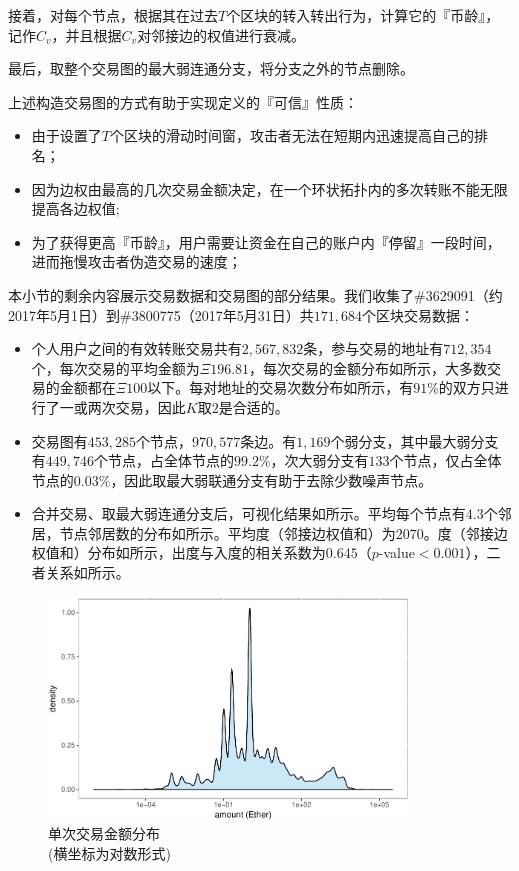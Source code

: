 接着，对每个节点，根据其在过去$T$个区块的转入转出行为，计算它的『币龄』，记作$C_v$，并且根据$C_v$对邻接边的权值进行衰减。

最后，取整个交易图的最大弱连通分支，将分支之外的节点删除。

上述构造交易图的方式有助于实现定义的『可信』性质：
\begin{itemize}
	\item 由于设置了$T$个区块的滑动时间窗，攻击者无法在短期内迅速提高自己的排名；
	\item 因为边权由最高的几次交易金额决定，在一个环状拓扑内的多次转账不能无限提高各边权值;
	\item 为了获得更高『币龄』，用户需要让资金在自己的账户内『停留』一段时间，进而拖慢攻击者伪造交易的速度；
\end{itemize}

本小节的剩余内容展示交易数据和交易图的部分结果。我们收集了\#3629091（约2017年5月1日）到\#3800775（2017年5月31日）共$171,684$个区块交易数据：
\begin{itemize}
	\item 个人用户之间的有效转账交易共有$2,567,832$条，参与交易的地址有$712,354$个，每次交易的平均金额为$\Xi 196.81$，每次交易的金额分布如所示，大多数交易的金额都在$\Xi 100$以下。每对地址的交易次数分布如所示，有$91\%$的双方只进行了一或两次交易，因此$K$取$2$是合适的。
	\item 交易图有$453,285$个节点，$970,577$条边。有$1,169$个弱分支，其中最大弱分支有$449,746$个节点，占全体节点的$99.2\%$，次大弱分支有$133$个节点，仅占全体节点的$0.03\%$，因此取最大弱联通分支有助于去除少数噪声节点。
	\item 合并交易、取最大弱连通分支后，可视化结果如所示。平均每个节点有$4.3$个邻居，节点邻居数的分布如所示。平均度（邻接边权值和）为$2070$。度（邻接边权值和）分布如所示，出度与入度的相关系数为$0.645$（$p$-value$<0.001$），二者关系如所示。
\end{itemize}

\begin{figure}
	\centering
	\includegraphics[width=0.85\textwidth]{figs/txad.pdf}
	\caption{单次交易金额分布 \\ \small{(横坐标为对数形式)}}\label{fig:txad}
\end{figure}


